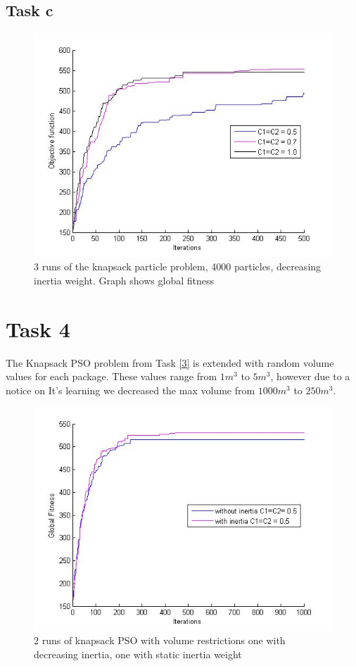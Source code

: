 \documentclass[12pt, a4paper]{article}
\begin{document}
\subsection{Task c}
\begin{figure}[H]
\begin{center}
\includegraphics[width=18cm]{KnapSack_withInteria}
\caption{3 runs of the knapsack particle problem, 4000 particles, decreasing inertia weight. Graph shows global fitness}
\end{center}
\end{figure}

\section{Task 4}
The Knapsack PSO problem from Task \ref{3} is extended with random volume values for each package. These values range from $1m^3$ to $5m^3$, however due to a notice on It's learning we decreased the max volume from $1000m^3$ to $250m^3$.
\begin{figure}[H]
\begin{center}
\includegraphics[width=18cm]{KnapSack_Volume}
\caption{2 runs of knapsack PSO with volume restrictions one with decreasing inertia, one with static inertia weight}
\end{center}

\end{figure}
\end{document}
